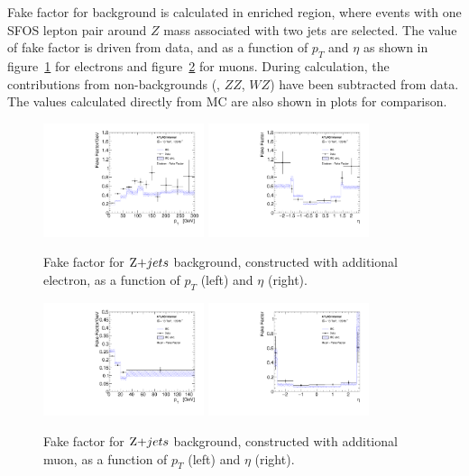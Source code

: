 Fake factor for \Zjet background is calculated in \Zjet enriched region, where events with one SFOS lepton pair around $Z$ mass associated with two jets are selected.
The value of fake factor is driven from data, and as a function of $p_{T}$ and $\eta$ as shown in figure~\ref{fig:fake_zjet_el} for electrons and figure~\ref{fig:fake_zjet_mu} for muons.
During calculation, the contributions from non-\Zjet backgrounds (\ttbar, $ZZ$, $WZ$) have been subtracted from data.
The values calculated directly from \Zjet MC are also shown in plots for comparison.
\begin{figure}[!htb]
  \centering
  \includegraphics[width=0.42\textwidth]{figures/VBSZZ/fakebkg/Electron_2Dff_ptfakeFactorAddElectron_etapt_pavgy.pdf}
  \includegraphics[width=0.42\textwidth]{figures/VBSZZ/fakebkg/Electron_2Dff_etafakeFactorAddElectron_etapt_pavgx.pdf}
  \caption{Fake factor for $\Zjet$ background, constructed with additional electron, as a function of $p_{T}$ (left) and $\eta$ (right).}
  \label{fig:fake_zjet_el}
\end{figure}

\begin{figure}[!htb]
  \centering
  \includegraphics[width=0.42\textwidth]{figures/VBSZZ/fakebkg/Muon_2Dff_ptfakeFactorAddMuon_etapt_pavgy.pdf}
  \includegraphics[width=0.42\textwidth]{figures/VBSZZ/fakebkg/Muon_2Dff_etafakeFactorAddMuon_etapt_pavgx.pdf}
  \caption{Fake factor for $\Zjet$ background, constructed with additional muon, as a function of $p_{T}$ (left) and $\eta$ (right).}
  \label{fig:fake_zjet_mu}
\end{figure}

